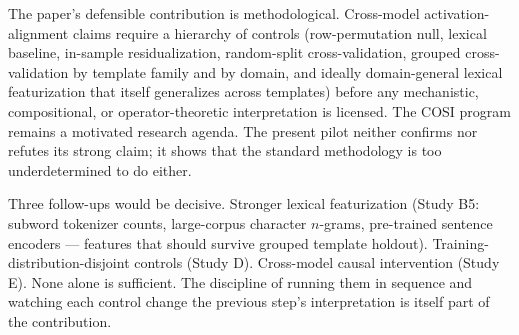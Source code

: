 The paper's defensible contribution is methodological. Cross-model
activation-alignment claims require a hierarchy of controls
(row-permutation null, lexical baseline, in-sample residualization,
random-split cross-validation, grouped cross-validation by template
family and by domain, and ideally domain-general lexical
featurization that itself generalizes across templates) before any
mechanistic, compositional, or operator-theoretic interpretation is
licensed. The COSI program remains a motivated research agenda. The
present pilot neither confirms nor refutes its strong claim; it
shows that the standard methodology is too underdetermined to do
either.

Three follow-ups would be decisive. Stronger lexical featurization
(Study B5: subword tokenizer counts, large-corpus character $n$-grams,
pre-trained sentence encoders --- features that should survive grouped
template holdout). Training-distribution-disjoint controls (Study D).
Cross-model causal intervention (Study E). None alone is sufficient.
The discipline of running them in sequence and watching each control
change the previous step's interpretation is itself part of the
contribution.
